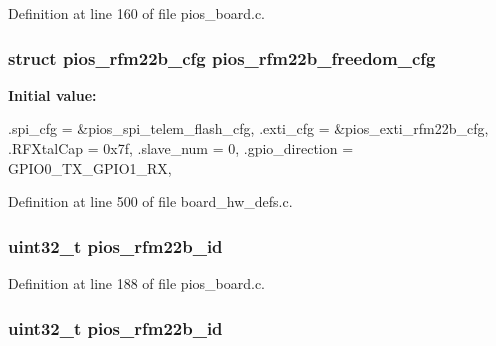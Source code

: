 \-Definition at line 160 of file pios\-\_\-board.\-c.

\hypertarget{group___freedom_ga90c3bcd6b750abf0c59333f52475d875}{
\subsubsection[{pios\-\_\-rfm22b\-\_\-freedom\-\_\-cfg}]{\setlength{\rightskip}{0pt plus 5cm}struct {\bf pios\-\_\-rfm22b\-\_\-cfg} {\bf pios\-\_\-rfm22b\-\_\-freedom\-\_\-cfg}}}\label{group___freedom_ga90c3bcd6b750abf0c59333f52475d875}
{\bfseries \-Initial value\-:}
\begin{DoxyCode}
 {
        .spi_cfg = &pios_spi_telem_flash_cfg,
        .exti_cfg = &pios_exti_rfm22b_cfg,
        .RFXtalCap = 0x7f,
        .slave_num = 0,
        .gpio_direction = GPIO0_TX_GPIO1_RX,
}
\end{DoxyCode}


\-Definition at line 500 of file board\-\_\-hw\-\_\-defs.\-c.

\hypertarget{group___freedom_ga1e0b7d2eb8b8640e07daa1f381780972}{
\subsubsection[{pios\-\_\-rfm22b\-\_\-id}]{\setlength{\rightskip}{0pt plus 5cm}uint32\-\_\-t {\bf pios\-\_\-rfm22b\-\_\-id}}}\label{group___freedom_ga1e0b7d2eb8b8640e07daa1f381780972}


\-Definition at line 188 of file pios\-\_\-board.\-c.

\hypertarget{group___freedom_ga1e0b7d2eb8b8640e07daa1f381780972}{
\subsubsection[{pios\-\_\-rfm22b\-\_\-id}]{\setlength{\rightskip}{0pt plus 5cm}uint32\-\_\-t {\bf pios\-\_\-rfm22b\-\_\-id}}}\label{group___freedom_ga1e0b7d2eb8b8640e07daa1f381780972}


